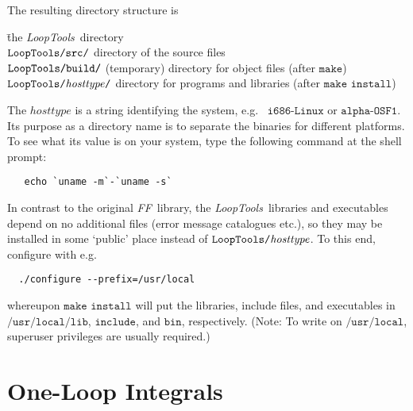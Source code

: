 \documentclass[twoside,12pt]{report}
\def\greyed#1{\special{ps: .7 setgray}#1\special{ps: 0 setgray}}
\def\FF{\textit{FF}}
\def\LT{\textit{LoopTools}}
\def\eg{e.g.\ }
\def\Code#1{\ensuremath{\texttt{#1}}}
\def\Var#1{\ensuremath{\mathit{#1}}}
\begin{document}
\pagebreak

The resulting directory structure is
\begin{tabbing}
\rlap{\Code{LoopTools/}}\hspace{.3\linewidth} \=
	the \LT\ directory \\
\Code{\greyed{LoopTools/}src/} \>
	directory of the source files \\
\Code{\greyed{LoopTools/}build/} \>
	(temporary) directory for object files (after \Code{make}) \\
\Code{\greyed{LoopTools/}\Var{hosttype}/} \>
	directory for programs and libraries (after \Code{make install}) 
\end{tabbing}

%
The \Var{hosttype} is a string identifying the system, \eg 
\Code{i686-Linux} or \Code{alpha-OSF1}.  Its purpose as a directory 
name is to separate the binaries for different platforms.  To see what 
its value is on your system, type the following command at the shell 
prompt:
\begin{verbatim}
   echo `uname -m`-`uname -s`
\end{verbatim}

In contrast to the original \FF\ library, the \LT\ libraries and
executables depend on no additional files (error message catalogues etc.),
so they may be installed in some `public' place instead of
\Code{LoopTools/\Var{hosttype}}.  To this end, configure with \eg
\begin{verbatim}
  ./configure --prefix=/usr/local
\end{verbatim}
whereupon \Code{make install} will put the libraries, include files,
and executables in \Code{/usr/local/lib}, \Code{include}, and
\Code{bin}, respectively.  (Note: To write on \Code{/usr/local}, 
superuser privileges are usually required.)


\clearpage

\section{One-Loop Integrals}
\label{sect:loopint}
\end{document}
